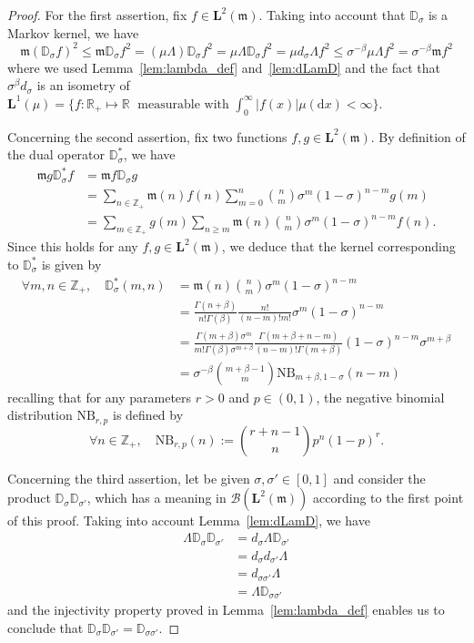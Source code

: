 \documentclass[AHL,Unicode,longabstracts]{cedram}
\newcommand{\df}{\mathrel{:=}}
\newcommand{\cB}{{\mathcal B}}
\newcommand{\RR}{\mathbb{R}}
\newcommand{\ZZ}{\mathbb{Z}}
\newcommand{\fm}{\mathfrak{m}}
\newcommand{\esL}{\mathbf{L}}
\newcommand*\R{{\mathbb R}}
\newcommand{\discret}[1]{\mathds{#1}}
\let\oldforall\forall
\renewcommand*{\forall}{\mathrel{\oldforall}}
\newcommand*{\dd}{\mathrm{d}}
\newcommand*{\dx}{\dd x}
\begin{document}
\begin{proof}
For the first assertion, fix $f\in\esL^2(\fm)$. Taking into account that $\discret{D}_{\sigma}$ is a Markov kernel, we have
\[
\fm(\discret{D}_{\sigma}f)^2\leq \fm\discret{D}_{\sigma}f^2 =(\mu \Lambda)\discret{D}_{\sigma}f^2 =\mu \Lambda \discret{D}_{\sigma}f^2 =\mu d_{\sigma}\Lambda f^2
\leq {\sigma}^{-\beta}\mu \Lambda f^2 ={\sigma}^{-\beta} \fm f^2
\]
where we used Lemma~\ref{lem:lambda_def} and~\ref{lem:dLamD} and the fact that ${\sigma}^{\beta}d_{\sigma}$ is an isometry of $\esL^1(\mu)=\{f :\RR_+\mapsto \R \; \text{ measurable with } \int_{0}^{\infty}|f(x)| \mu(\dx)<\infty\}$.

Concerning the second assertion, fix two functions $f,g\in\esL^2(\fm)$. By definition of the dual operator $\discret{D}_{\sigma}^*$, we have
\begin{align*}
\fm g \discret{D}_{\sigma}^* f&=\fm f\discret{D}_{\sigma} g\\
&=\sum_{n\in\ZZ_+}\fm(n)f(n)\sum_{m=0}^n \binom{n}{m} {\sigma}^m(1-{\sigma})^{n-m} g(m)\\
&=\sum_{m\in\ZZ_+}g(m)\sum_{n\geq m}\fm(n)\binom{n}{m} {\sigma}^m(1-{\sigma})^{n-m}f(n).
\end{align*}
Since this holds for any $f,g\in\esL^2(\fm)$, we deduce that the kernel corresponding to $\discret{D}_{\sigma}^*$ is given by
\begin{align*}
\forall m,n\in\ZZ_+,\quad
\discret{D}_{\sigma}^*(m,n)&=\fm(n)\binom{n}{m} {\sigma}^m(1-{\sigma})^{n-m}\\
&=\frac{\Gamma(n+\beta)}{n!\Gamma(\beta)}\frac{n!}{(n-m)! m!}{\sigma}^m(1-{\sigma})^{n-m}\\
&=\frac{\Gamma(m+\beta){\sigma}^m}{m!\Gamma(\beta){\sigma}^{m+\beta}}\frac{\Gamma(m+\beta+n-m)}{(n-m)!\Gamma(m+\beta)}(1-{\sigma})^{n-m}{\sigma}^{m+\beta}\\
&={\sigma}^{-\beta}\binom{m+\beta-1}{m}\mathrm{NB}_{m+\beta,1-{\sigma}}(n-m)
\end{align*}
recalling that for any parameters $r>0$ and $p\in(0,1)$, the negative binomial distribution $\mathrm{NB}_{r,p}$ is defined by
\[
\forall n\in\ZZ_+,\quad \mathrm{NB}_{r,p}(n)\df \binom{r+n-1}{n}p^n(1-p)^{r}.
\]


Concerning the third assertion, let be given ${\sigma},{\sigma}'\in[0,1]$ and consider the product $\discret{D}_{\sigma}\discret{D}_{{\sigma}'}$, which has a meaning in $\cB(\esL^2(\fm))$ according to the first point of this proof. Taking into account Lemma~\ref{lem:dLamD}, we have
\begin{align*}
\Lambda \discret{D}_{\sigma}\discret{D}_{{\sigma}'}&=d_{\sigma}\Lambda \discret{D}_{{\sigma}'}\\
&=d_{\sigma}d_{{\sigma}'}\Lambda\\
&=d_{{\sigma}{\sigma}'}\Lambda\\
&=\Lambda\discret{D}_{{\sigma}{\sigma}'}
\end{align*}
and the injectivity property proved in Lemma~\ref{lem:lambda_def} enables us to conclude that $\discret{D}_{\sigma}\discret{D}_{{\sigma}'}=\discret{D}_{{\sigma}{\sigma}'}$.
\end{proof}
\end{document}
